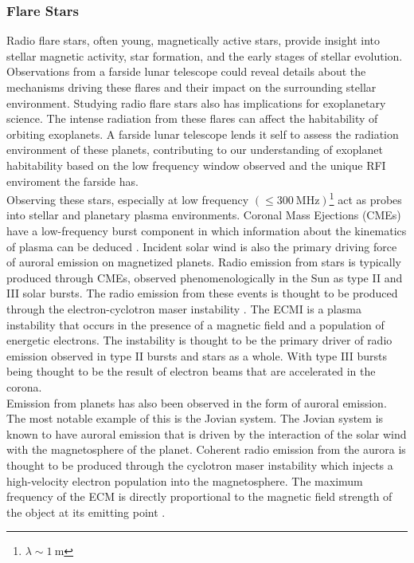 \subsubsection{Flare Stars}

Radio flare stars, often young, magnetically active stars, provide insight into stellar magnetic activity, star formation, and the early stages of stellar evolution. Observations from a farside lunar telescope could reveal details about the mechanisms driving these flares and their impact on the surrounding stellar environment. Studying radio flare stars also has implications for exoplanetary science. The intense radiation from these flares can affect the habitability of orbiting exoplanets. A farside lunar telescope lends it self to assess the radiation environment of these planets, contributing to our understanding of exoplanet habitability based on the low frequency window observed and the unique RFI enviroment the farside has. \\ 

Observing these stars, especially at low frequency $(\leq 300 \ \text{MHz})$\footnote{$\lambda \sim 1 \ \text{m}$} act as probes into stellar and planetary plasma environments. Coronal Mass Ejections (CMEs) have a low-frequency burst component in which information about the kinematics of plasma can be deduced \citep{villadsen_ultra-wideband_2019}. Incident solar wind is also the primary driving force of auroral emission on magnetized planets. Radio emission from stars is typically produced through CMEs, observed phenomenologically in the Sun as type II and III solar bursts. The radio emission from these events is thought to be produced through the electron-cyclotron maser instability \citep[ECMI;][]{EMI}. The ECMI is a plasma instability that occurs in the presence of a magnetic field and a population of energetic electrons. The instability is thought to be the primary driver of radio emission observed in type II bursts and stars as a whole. With type III bursts being thought to be the result of electron beams that are accelerated in the corona. \\

Emission from planets has also been observed in the form of auroral emission. The most notable example of this is the Jovian system. The Jovian system is known to have auroral emission that is driven by the interaction of the solar wind with the magnetosphere of the planet. Coherent radio emission from the aurora is thought to be produced through the cyclotron maser instability \citep[ECM;][]{zarka_auroral_1998} which injects a high-velocity electron population into the magnetosphere. The maximum frequency of the ECM is directly proportional to the magnetic field strength of the object at its emitting point \citep{kavanagh_hunting_2023, joe_nature_review}.\\


